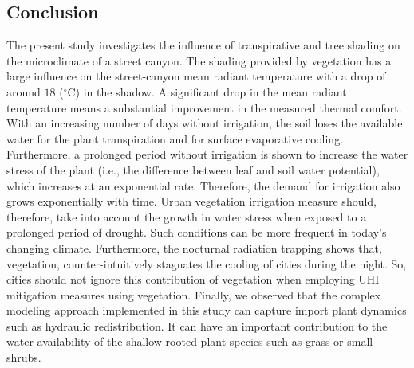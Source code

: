 
\subsection{Conclusion}

The present study investigates the influence of transpirative and tree shading on the microclimate of a street canyon. The shading provided by vegetation has a large influence on the street-canyon mean radiant temperature with a drop of around $18$ ($^{\circ}$C) in the shadow. A significant drop in the mean radiant temperature means a substantial improvement in the measured thermal comfort.  With an increasing number of days without irrigation, the soil loses the available water for the plant transpiration and for surface evaporative cooling. Furthermore, a prolonged period without irrigation is shown to increase the water stress of the plant (i.e., the difference between leaf and soil water potential), which increases at an exponential rate. Therefore, the demand for irrigation also grows exponentially with time. Urban vegetation irrigation measure should, therefore, take into account the growth in water stress when exposed to a prolonged period of drought. Such conditions can be more frequent in today's changing climate. Furthermore, the nocturnal radiation trapping shows that, vegetation, counter-intuitively stagnates the cooling of cities during the night. So, cities should not ignore this contribution of vegetation when employing UHI mitigation measures using vegetation. Finally, we observed that the complex modeling approach implemented in this study can capture import plant dynamics such as hydraulic redistribution. It can have an important contribution to the water availability of the shallow-rooted plant species such as grass or small shrubs.

